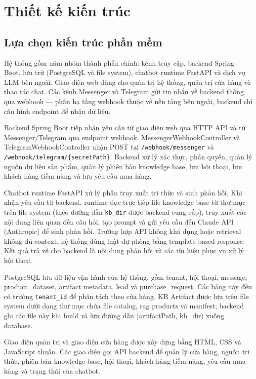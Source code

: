 \documentclass[../DoAn.tex]{subfiles}
\begin{document}
\section{Thiết kế kiến trúc}
\label{section:4.1}

\subsection{Lựa chọn kiến trúc phần mềm}
\label{subsection:4.1.1}

Hệ thống gồm năm nhóm thành phần chính: kênh truy cập, backend Spring Boot, lưu trữ (PostgreSQL và file system), chatbot runtime FastAPI và dịch vụ LLM bên ngoài. Giao diện web dùng cho quản trị hệ thống, quản trị cửa hàng và thao tác chat. Các kênh Messenger và Telegram gửi tin nhắn về backend thông qua webhook — phần hạ tầng webhook thuộc về nền tảng bên ngoài, backend chỉ cấu hình endpoint để nhận dữ liệu.

Backend Spring Boot tiếp nhận yêu cầu từ giao diện web qua HTTP API và từ Messenger/Telegram qua endpoint webhook. MessengerWebhookController và TelegramWebhookController nhận POST tại \texttt{/webhook/messenger} và \texttt{/webhook/telegram/\{secretPath\}}. Backend xử lý xác thực, phân quyền, quản lý nguồn dữ liệu sản phẩm, quản lý phiên bản knowledge base, lưu hội thoại, lưu khách hàng tiềm năng và lưu yêu cầu mua hàng.

Chatbot runtime FastAPI xử lý phần truy xuất tri thức và sinh phản hồi. Khi nhận yêu cầu từ backend, runtime đọc trực tiếp file knowledge base từ thư mục trên file system (theo đường dẫn \texttt{kb\_dir} được backend cung cấp), truy xuất các nội dung liên quan đến câu hỏi, tạo prompt và gửi yêu cầu đến Claude API (Anthropic) để sinh phản hồi. Trường hợp API không khả dụng hoặc retrieval không đủ context, hệ thống dùng luật dự phòng bằng template-based response. Kết quả trả về cho backend là nội dung phản hồi và các tín hiệu phục vụ xử lý hội thoại.

PostgreSQL lưu dữ liệu vận hành của hệ thống, gồm tenant, hội thoại, message, product\_dataset, artifact metadata, lead và purchase\_request. Các bảng này đều có trường \texttt{tenant\_id} để phân tách theo cửa hàng. KB Artifact được lưu trên file system dưới dạng thư mục chứa file catalog, rag products và manifest; backend ghi các file này khi build và lưu đường dẫn (artifactPath, kb\_dir) xuống database.

Giao diện quản trị và giao diện cửa hàng được xây dựng bằng HTML, CSS và JavaScript thuần. Các giao diện gọi API backend để quản lý cửa hàng, nguồn tri thức, phiên bản knowledge base, hội thoại, khách hàng tiềm năng, yêu cầu mua hàng và trạng thái của chatbot.
\end{document}
